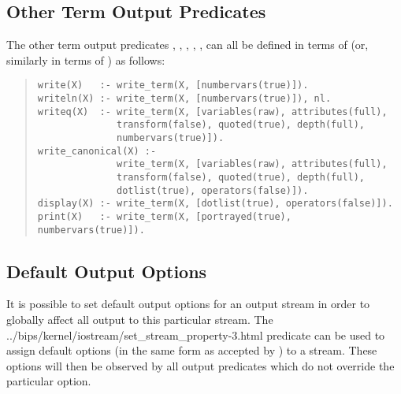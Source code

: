 \subsection{Other Term Output Predicates}

The other term output predicates
,
,
,
,
,
can all be defined in terms of  (or, similarly
in terms of ) as follows:
\begin{quote}
\begin{verbatim}
write(X)   :- write_term(X, [numbervars(true)]).
writeln(X) :- write_term(X, [numbervars(true)]), nl.
writeq(X)  :- write_term(X, [variables(raw), attributes(full),
              transform(false), quoted(true), depth(full),
              numbervars(true)]).
write_canonical(X) :-
              write_term(X, [variables(raw), attributes(full),
              transform(false), quoted(true), depth(full),
              dotlist(true), operators(false)]).
display(X) :- write_term(X, [dotlist(true), operators(false)]).
print(X)   :- write_term(X, [portrayed(true), numbervars(true)]).
\end{verbatim}
\end{quote}


\subsection{Default Output Options}

It is possible to set default output options for an output stream
in order to globally affect all output to this particular stream.
The
%
{../bips/kernel/iostream/set_stream_property-3.html}
predicate can be used to assign default options (in the same form as
accepted by ) to a stream.
These options will then be observed by all output predicates which do not
override the particular option.

